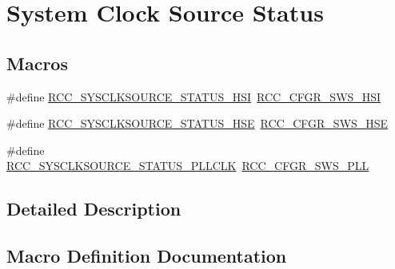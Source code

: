 \hypertarget{group___r_c_c___system___clock___source___status}{}\section{System Clock Source Status}
\label{group___r_c_c___system___clock___source___status}
\subsection*{Macros}
\begin{DoxyCompactItemize}
\item 
\#define \hyperlink{group___r_c_c___system___clock___source___status_ga0d6c2b0b2d59e6591295649853bb2abd}{R\+C\+C\+\_\+\+S\+Y\+S\+C\+L\+K\+S\+O\+U\+R\+C\+E\+\_\+\+S\+T\+A\+T\+U\+S\+\_\+\+H\+SI}~\hyperlink{group___peripheral___registers___bits___definition_ga6764639cf221e1ebc0b5448dcaed590a}{R\+C\+C\+\_\+\+C\+F\+G\+R\+\_\+\+S\+W\+S\+\_\+\+H\+SI}
\item 
\#define \hyperlink{group___r_c_c___system___clock___source___status_ga3847769265bf19becf7b976a7e908a64}{R\+C\+C\+\_\+\+S\+Y\+S\+C\+L\+K\+S\+O\+U\+R\+C\+E\+\_\+\+S\+T\+A\+T\+U\+S\+\_\+\+H\+SE}~\hyperlink{group___peripheral___registers___bits___definition_gae09a0202f441c1a43e69c62331d50a08}{R\+C\+C\+\_\+\+C\+F\+G\+R\+\_\+\+S\+W\+S\+\_\+\+H\+SE}
\item 
\#define \hyperlink{group___r_c_c___system___clock___source___status_ga4f05019ec09da478d084f44dbaad7d6d}{R\+C\+C\+\_\+\+S\+Y\+S\+C\+L\+K\+S\+O\+U\+R\+C\+E\+\_\+\+S\+T\+A\+T\+U\+S\+\_\+\+P\+L\+L\+C\+LK}~\hyperlink{group___peripheral___registers___bits___definition_ga2c67e2279804a83ef24438267d9d4a6c}{R\+C\+C\+\_\+\+C\+F\+G\+R\+\_\+\+S\+W\+S\+\_\+\+P\+LL}
\end{DoxyCompactItemize}


\subsection{Detailed Description}


\subsection{Macro Definition Documentation}
\mbox{\label{group___r_c_c___system___clock___source___status_ga3847769265bf19becf7b976a7e908a64}} 
